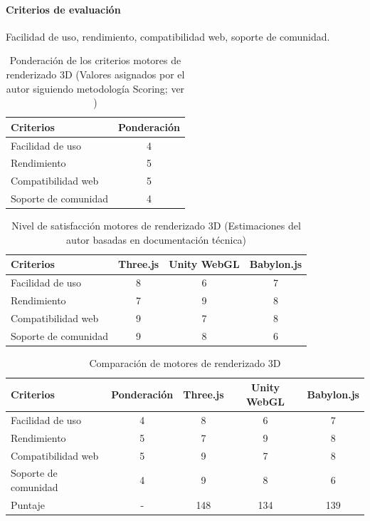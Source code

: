 \paragraph{Criterios de evaluación}
Facilidad de uso, rendimiento, compatibilidad web, soporte de comunidad.
\begin{table}[ht]
\centering
\caption{Ponderación de los criterios motores de renderizado 3D (Valores asignados por el autor siguiendo metodología Scoring; ver \cite{belton2002})}
\begin{tabular}{l c}
\hline
Criterios & Ponderación \\
\hline
Facilidad de uso & 4 \\
Rendimiento & 5 \\
Compatibilidad web & 5 \\
Soporte de comunidad & 4 \\
\hline
\end{tabular}
\end{table}

\begin{table}[ht]
\centering
\caption{Nivel de satisfacción motores de renderizado 3D (Estimaciones del autor basadas en documentación técnica)}
\begin{tabular}{l c c c}
\hline
Criterios & Three.js & Unity WebGL & Babylon.js \\
\hline
Facilidad de uso & 8 & 6 & 7 \\
Rendimiento & 7 & 9 & 8 \\
Compatibilidad web & 9 & 7 & 8 \\
Soporte de comunidad & 9 & 8 & 6 \\
\hline
\end{tabular}
\end{table}
\FloatBarrier

\begin{table}[ht]
\centering
\caption{Comparación de motores de renderizado 3D}
\begin{tabular}{l c c c c}
\hline
Criterios & Ponderación & Three.js & Unity WebGL & Babylon.js \\
\hline
Facilidad de uso & 4 & 8 & 6 & 7 \\
Rendimiento & 5 & 7 & 9 & 8 \\
Compatibilidad web & 5 & 9 & 7 & 8 \\
Soporte de comunidad & 4 & 9 & 8 & 6 \\
\hline
Puntaje & - & 148 & 134 & 139 \\
\hline
\end{tabular}
\end{table}
\FloatBarrier
